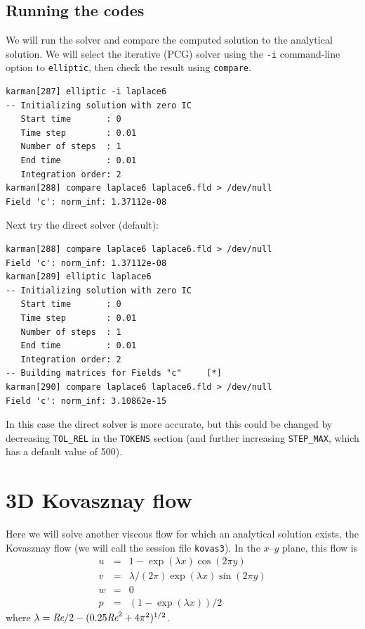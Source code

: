 \documentclass[11pt,a4paper]{report}
\def\Rey{\mbox{\it Re}}                             %
\begin{document}
\subsection{Running the codes}

We will run the solver and compare the computed solution to the
analytical solution.  We will select the iterative (PCG) solver using
the \verb+-i+ command-line option to \texttt{elliptic}, then check the 
result using \texttt{compare}.
{\small
\begin{verbatim}
karman[287] elliptic -i laplace6
-- Initializing solution with zero IC
   Start time       : 0
   Time step        : 0.01
   Number of steps  : 1
   End time         : 0.01
   Integration order: 2
karman[288] compare laplace6 laplace6.fld > /dev/null
Field 'c': norm_inf: 1.37112e-08
\end{verbatim}
}

Next try the direct solver (default):
{\small
\begin{verbatim}
karman[288] compare laplace6 laplace6.fld > /dev/null
Field 'c': norm_inf: 1.37112e-08
karman[289] elliptic laplace6
-- Initializing solution with zero IC
   Start time       : 0
   Time step        : 0.01
   Number of steps  : 1
   End time         : 0.01
   Integration order: 2
-- Building matrices for Fields "c"     [*]
karman[290] compare laplace6 laplace6.fld > /dev/null
Field 'c': norm_inf: 3.10862e-15
\end{verbatim}
}
\noindent
In this case the direct solver is more accurate, but this could be changed
by decreasing \verb+TOL_REL+ in the \texttt{TOKENS} section (and further
increasing \verb+STEP_MAX+, which has a default value of 500).

\section{3D Kovasznay flow}

Here we will solve another viscous flow for which an analytical
solution exists, the Kovasznay flow (we will call the session file
\verb+kovas3+).  In the $x$--$y$ plane, this flow is
\begin{eqnarray}
        u &=& 1 - \exp(\lambda x)\cos(2\pi y)           \\
        v &=& \lambda/(2\pi)\exp(\lambda x)\sin(2\pi y) \\
        w &=& 0                                         \\
        p &=& (1 - \exp(\lambda x))/2   
\end{eqnarray}
where $\lambda = \Rey/2 - (0.25\Rey^2 + 4\pi^2)^{1/2}$.
\end{document}
